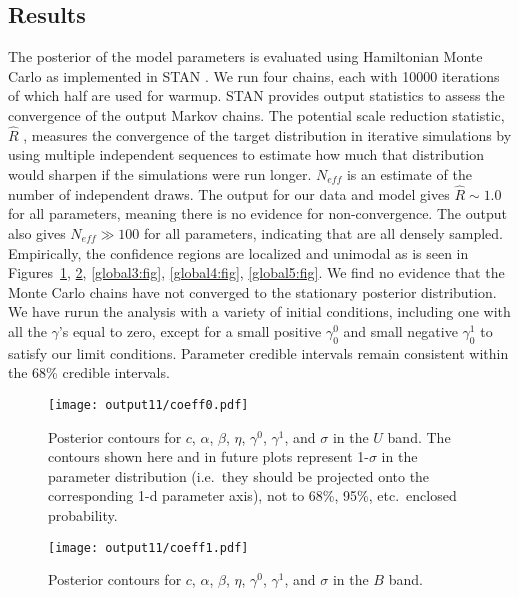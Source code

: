 \documentclass{aastex61}   	%
\begin{document}
\subsection{Results}
\label{results:sec}
The posterior of the model parameters is evaluated using Hamiltonian Monte Carlo as implemented in
STAN \citep{stan}.  We run four chains, each with 10000 iterations of which
half are used for warmup.
STAN provides output statistics to assess
the convergence of the output Markov chains.
The 
potential scale reduction statistic, $\hat{R}$ \citep{Gelman92}, measures the convergence of the target distribution
in iterative simulations 
by using multiple independent sequences to estimate how much that distribution would sharpen if the simulations were run longer.
$N_{eff}$ is an estimate of the number of independent draws. The output for our data and model gives $\hat{R} \sim 1.0$ for all parameters, meaning there is no evidence for non-convergence.  The
output also gives  $N_{eff} \gg 100$ for all parameters, indicating that are all densely sampled.
Empirically, the confidence regions are localized and unimodal as is seen in  Figures~\ref{global1:fig}, \ref{global2:fig}, \ref{global3:fig}, \ref{global4:fig},
\ref{global5:fig}.  We find no evidence that
the Monte Carlo chains have not converged to the stationary posterior distribution.
We have rurun the analysis with a variety of initial conditions, including one with all the $\gamma$'s equal to zero, except for a small positive 
$\gamma^0_0$ and small negative $\gamma^1_0$ to satisfy our limit conditions.  Parameter credible intervals
remain consistent within the 68\% credible intervals.

\begin{figure}[htbp] %
   \centering
   \texttt{[image: output11/coeff0.pdf]} 
            \caption{Posterior contours for $c$, $\alpha$, $\beta$, $\eta$, $\gamma^0$, $\gamma^1$, and $\sigma$ in the $U$ band.
            The contours shown here and in future plots represent 1-$\sigma$ in the parameter distribution (i.e.\ they should be
            projected onto the corresponding 1-d parameter axis), not to 68\%, 95\%, etc.\
            enclosed probability.  \label{global1:fig}}
\end{figure}

\begin{figure}[htbp] %
   \centering
   \texttt{[image: output11/coeff1.pdf]} 
            \caption{Posterior contours for $c$, $\alpha$, $\beta$, $\eta$, $\gamma^0$, $\gamma^1$, and $\sigma$ in the $B$ band.
 \label{global2:fig}}
\end{figure}
\end{document}
